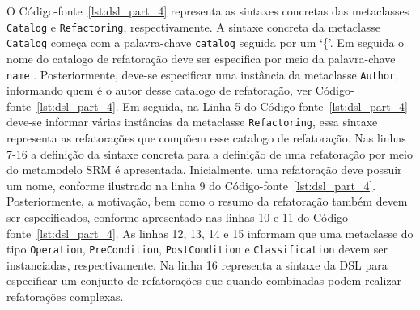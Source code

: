 O Código-fonte~\ref{lst:dsl_part_4} representa as sintaxes concretas das metaclasses \texttt{Catalog} e \texttt{Refactoring}, respectivamente. A sintaxe concreta da metaclasse \texttt{Catalog} começa com a palavra-chave \texttt{catalog} seguida por um `\{'. Em seguida o nome do catalogo de refatoração deve ser especifica por meio da palavra-chave \texttt{name} . Posteriormente, deve-se especificar uma instância da metaclasse \texttt{Author}, informando quem é o autor desse catalogo de refatoração, ver Código-fonte~\ref{lst:dsl_part_4}. Em seguida, na Linha 5 do Código-fonte~\ref{lst:dsl_part_4} deve-se informar várias instâncias da metaclasse \texttt{Refactoring}, essa sintaxe representa as refatorações que compõem esse catalogo de refatoração. Nas linhas 7-16 a definição da sintaxe concreta para a definição de uma refatoração por meio do metamodelo SRM é apresentada. Inicialmente, uma refatoração deve possuir um nome, conforme ilustrado na linha 9 do Código-fonte~\ref{lst:dsl_part_4}. Posteriormente, a motivação, bem como o resumo da refatoração também devem ser especificados, conforme apresentado nas linhas 10 e 11 do Código-fonte~\ref{lst:dsl_part_4}. As linhas 12, 13, 14 e 15 informam que uma metaclasse do tipo \texttt{Operation}, \texttt{PreCondition}, \texttt{PostCondition} e \texttt{Classification}  devem ser instanciadas, respectivamente. Na linha 16 representa a sintaxe da DSL para especificar um conjunto de refatorações que quando combinadas podem realizar refatorações complexas.

